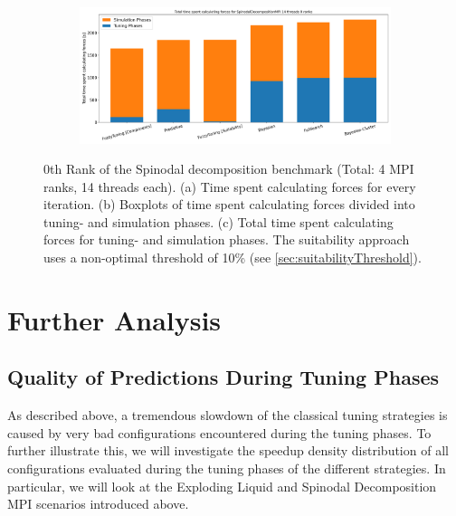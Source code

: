 \begin{figure}[H]
    \begin{subfigure}[b]{\textwidth}
        \includegraphics[width=\columnwidth,trim={0cm 0.5cm 0cm 0.9cm},clip]{figures/Benchmark/SpinodalDecompositionMPI/SpinodalDecompositionMPI_timings_total_SpinodalDecompositionMPI_14_0.png}
        \caption{}
        \label{fig:spinodalTotalTime_14thread}
    \end{subfigure}


    \caption[Benchmark Results for the Spinodal Decomposition MPI Scenario]{0th Rank of the Spinodal decomposition benchmark (Total: 4 MPI ranks, 14 threads each). (a) Time spent calculating forces for every iteration. (b) Boxplots of time spent calculating forces divided into tuning- and simulation phases. (c) Total time spent calculating forces for tuning- and simulation phases. The suitability approach uses a non-optimal threshold of 10\% (see \autoref{sec:suitabilityThreshold}).}
    \label{fig:spinodal_14thread}
\end{figure}



\section{Further Analysis}

\subsection{Quality of Predictions During Tuning Phases}

As described above, a tremendous slowdown of the classical tuning strategies is caused by very bad configurations encountered during the tuning phases. To further illustrate this, we will investigate the speedup density distribution of all configurations evaluated during the tuning phases of the different strategies. In particular, we will look at the Exploding Liquid and Spinodal Decomposition MPI scenarios introduced above.

